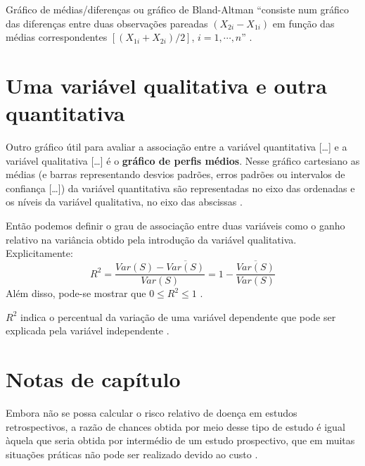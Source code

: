 \documentclass[
]{latex/krantz}
\renewenvironment{quote}{\begin{VF}}{\end{VF}}
\theoremstyle{definition}
\theoremstyle{definition}
\theoremstyle{definition}
\theoremstyle{definition}
\theoremstyle{remark}
\begin{document}
Gráfico de médias/diferenças ou gráfico de Bland-Altman ``consiste num gráfico das diferenças entre duas observações pareadas \((X_{2i} - X_{1i})\) em função das médias correspondentes \([(X_{1i} + X_{2i})/2]\), \(i = 1, \cdots, n\)'' \citep[p.~97-98]{MorettinSinger2022}.

\hypertarget{uma-variuxe1vel-qualitativa-e-outra-quantitativa}{%
\section{Uma variável qualitativa e outra quantitativa}\label{uma-variuxe1vel-qualitativa-e-outra-quantitativa}}

\begin{quote}
Outro gráfico útil para avaliar a associação entre a variável quantitativa {[}\ldots{]} e a variável qualitativa {[}\ldots{]} é o \textbf{gráfico de perfis médios}. Nesse gráfico cartesiano as médias (e barras representando desvios padrões, erros padrões ou intervalos de confiança {[}\ldots{]}) da variável quantitativa são representadas no eixo das ordenadas e os níveis da variável qualitativa, no eixo das abscissas \citep[p.~101]{MorettinSinger2022}.
\end{quote}

\begin{quote}
Então podemos definir o grau de associação entre duas variáveis como o ganho relativo na variância obtido pela introdução da variável qualitativa. Explicitamente: \[R^2 = \frac{Var(S) - \overline{Var(S)}}{Var(S)} = 1 - \frac{\overline{Var(S)}}{Var(S)}\] Além disso, pode-se mostrar que \(0 \le R^2 \le 1\) \citep[p.~106]{MorettinSinger2022}.
\end{quote}

\(R^2\) indica o percentual da variação de uma variável dependente que pode ser explicada pela variável independente \citep[p.~106]{MorettinSinger2022}.

\hypertarget{notas-de-capuxedtulo-2}{%
\section{Notas de capítulo}\label{notas-de-capuxedtulo-2}}

\begin{quote}
Embora não se possa calcular o risco relativo de doença em estudos retrospectivos, a razão de chances obtida por meio desse tipo de estudo é igual àquela que seria obtida por intermédio de um estudo prospectivo, que em muitas situações práticas não pode ser realizado devido ao custo \citep[p.~107]{MorettinSinger2022}.
\end{quote}
\end{document}
